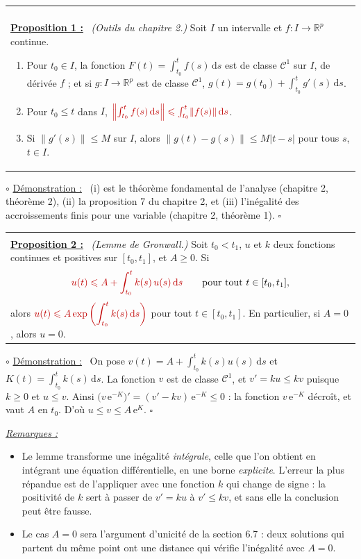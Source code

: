 \documentclass[a4paper,twoside]{report}
\makeatletter
\newcommand{\rmath}[1]{\textcolor{rougecours}{#1}}
\newenvironment{cadre}%
 {\par\vspace{2mm}\noindent\begin{tabular}{|@{\hspace{4mm}}p{0.93\textwidth}@{\hspace{4mm}}|}
  \hline \\[-2mm]}%
 {\\[2mm] \hline \end{tabular}\par\vspace{3mm}}
\newcommand{\propo}[1]{\textbf{\underline{Proposition #1 :}}~}
\newenvironment{demo}%
 {\par\needspace{4\baselineskip}\vspace{1mm}\noindent$\circ$ \underline{Démonstration :}~\setlength{\parskip}{3pt plus 1pt}}%
 {\hfill$\square$\par\vspace{2mm}}
\newenvironment{remarques}%
 {\par\needspace{6\baselineskip}\vspace{1mm}\begin{list}{}{\leftmargin=1cm \rightmargin=0.5cm}\item[]%
  \textit{\underline{Remarques :}}%
  \begin{itemize}[label=$\bullet$,leftmargin=0.45cm,topsep=3pt,itemsep=4pt]}%
 {\end{itemize}\end{list}\vspace{1mm}}
\newcommand{\R}{\mathbb{R}}
\newcommand{\ee}{\mathrm{e}}                      %
\newcommand{\dd}{\mathrm{d}}                      %
\newcommand{\norme}[1]{\lVert #1 \rVert}         %
\newcommand{\Cc}{\mathcal{C}}                     %
\makeatother
\begin{document}
\begin{cadre}
\propo{1} \emph{(Outils du chapitre 2.)} Soit $I$ un intervalle et $f : I \to \R^{p}$ continue.
\begin{enumerate}[label=(\roman*),topsep=3pt,itemsep=2pt]
  \item Pour $t_{0} \in I$, la fonction $F(t) = \displaystyle\int_{t_{0}}^{t} f(s)\,\dd s$ est de classe $\Cc^{1}$ sur $I$, de dérivée $f$ ; et si $g : I \to \R^{p}$ est de classe $\Cc^{1}$, $g(t) = g(t_{0}) + \displaystyle\int_{t_{0}}^{t} g'(s)\,\dd s$.
  \item Pour $t_{0} \leqslant t$ dans $I$, $\rmath{\left\|\int_{t_{0}}^{t} f(s)\,\dd s\right\| \leqslant \int_{t_{0}}^{t} \norme{f(s)}\,\dd s}$.
  \item Si $\norme{g'(s)} \leqslant M$ sur $I$, alors $\norme{g(t) - g(s)} \leqslant M|t - s|$ pour tous $s$, $t \in I$.
\end{enumerate}
\end{cadre}

\begin{demo}
(i) est le théorème fondamental de l'analyse (chapitre 2, théorème 2), (ii) la proposition 7 du chapitre 2, et (iii) l'inégalité des accroissements finis pour une variable (chapitre 2, théorème 1).
\end{demo}

\begin{cadre}
\propo{2} \emph{(Lemme de Gronwall.)} Soit $t_{0} < t_{1}$, $u$ et $k$ deux fonctions continues et positives sur $[t_{0}, t_{1}]$, et $A \geqslant 0$. Si
\[ \rmath{u(t) \leqslant A + \int_{t_{0}}^{t} k(s)\,u(s)\,\dd s} \qquad \text{pour tout } t \in [t_{0}, t_{1}], \]
alors $\rmath{u(t) \leqslant A\exp\left(\displaystyle\int_{t_{0}}^{t} k(s)\,\dd s\right)}$ pour tout $t \in [t_{0}, t_{1}]$. En particulier, si $A = 0$, alors $u = 0$.
\end{cadre}

\begin{demo}
On pose $v(t) = A + \displaystyle\int_{t_{0}}^{t} k(s)u(s)\,\dd s$ et $K(t) = \displaystyle\int_{t_{0}}^{t} k(s)\,\dd s$. La fonction $v$ est de classe $\Cc^{1}$, et $v' = ku \leqslant kv$ puisque $k \geqslant 0$ et $u \leqslant v$. Ainsi $\big(v\,\ee^{-K}\big)' = (v' - kv)\,\ee^{-K} \leqslant 0$ : la fonction $v\,\ee^{-K}$ décroît, et vaut $A$ en $t_{0}$. D'où $u \leqslant v \leqslant A\,\ee^{K}$.
\end{demo}

\begin{remarques}
  \item Le lemme transforme une inégalité \emph{intégrale}, celle que l'on obtient en intégrant une équation différentielle, en une borne \emph{explicite}. L'erreur la plus répandue est de l'appliquer avec une fonction $k$ qui change de signe : la positivité de $k$ sert à passer de $v' = ku$ à $v' \leqslant kv$, et sans elle la conclusion peut être fausse.
  \item Le cas $A = 0$ sera l'argument d'unicité de la section 6.7 : deux solutions qui partent du même point ont une distance qui vérifie l'inégalité avec $A = 0$.
\end{remarques}
\end{document}
